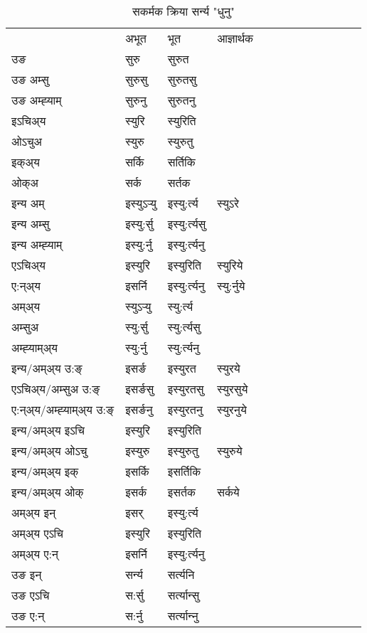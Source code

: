 \begin{table}[H]
\label{ur.vt} \centering
\caption{सकर्मक क्रिया  सर्न्य  "धुनु"  }
\begin{tabular}{l|l|l|l|l|l|l|l|l|l|l|l|l}  \toprule
&अभूत & भूत & आज्ञार्थक \\ 
उङ &सुरु &सुरुत \\ 
उङ अम्सु &सुरुसु &सुरुतसु \\ 
उङ अम्ह्‍याम् &सुरुनु &सुरुतनु \\ 
इऽचिअ्य &स्युरि &स्युरिति   \\ 
ओऽचुअ &स्युरु &स्युरुतु   \\ 
इक्अ्य &सर्कि &सर्तिकि   \\ 
ओक्अ &सर्क &सर्तक   \\ 
इन्य अम् & इस्युऽर्‍यु  & इस्यु:र्त्य &स्युऽरे  \\ 
इन्य अम्सु & इस्यु:र्सु  & इस्यु:र्त्यसु   \\ 
इन्य अम्ह्‍याम् & इस्यु:र्नु  & इस्यु:र्त्यनु   \\ 
एऽचिअ्य & इस्युरि & इस्युरिति &स्युरिये    \\ 
ए:न्अ्य & इसर्नि  & इस्यु:र्त्यनु &स्यु:र्नुये  \\ 
अम्अ्य & स्युऽर्‍यु  & स्यु:र्त्य  \\ 
अम्सुअ & स्यु:र्सु & स्यु:र्त्यसु  \\ 
अम्ह्‍याम्अ्य & स्यु:र्नु  & स्यु:र्त्यनु \\ 
\midrule
इन्य/अम्अ्य उ:ङ्‌&इसर्ङ & इस्युरत &स्युरये \\ 
एऽचिअ्य/अम्सुअ उ:ङ्‌ &इसर्ङसु & इस्युरतसु &स्युरसुये \\ 
ए:न्अ्य/अम्ह्‍याम्अ्य उ:ङ्‌ &इसर्ङनु & इस्युरतनु &स्युरनुये \\ 
इन्य/अम्अ्य इऽचि & इस्युरि & इस्युरिति    \\ 
इन्य/अम्अ्य ओऽचु & इस्युरु & इस्युरुतु  &स्युरुये  \\ 
इन्य/अम्अ्य इक् & इसर्कि & इसर्तिकि   \\ 
इन्य/अम्अ्य ओक् & इसर्क & इसर्तक  &सर्कये  \\ 
अम्अ्य इन् & इसर् & इस्यु:र्त्य   \\ 
अम्अ्य एऽचि & इस्युरि & इस्युरिति    \\ 
अम्अ्य ए:न् & इसर्नि  & इस्यु:र्त्यनु  \\ 
\midrule
उङ इन् & सर्न्य  & सर्त्यनि  \\ 
उङ एऽचि & स:र्सु  & सर्त्यान्सु   \\ 
उङ ए:न्& स:र्नु  & सर्त्यान्‍नु   \\ 
\bottomrule
\end{tabular}
\end{table}


